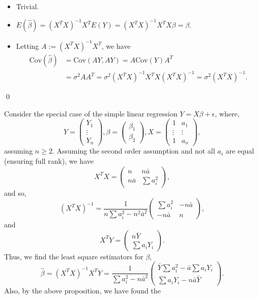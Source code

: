 \documentclass[
]{article}
\theoremstyle{definition}
\theoremstyle{definition}
\begin{document}
\begin{itemize}
    \item Trivial.
    \item \(E(\hat \beta) = (X^TX)^{-1} X^T E(Y) = (X^TX)^{-1} X^T X \beta = \beta\).
    \item Letting \(A := (X^T X)^{-1} X^T\), we have 
      \[\begin{split}
        \text{Cov}(\hat \beta) & = \text{Cov}(A Y, A Y) = A \text{Cov}(Y) A^T\\
          & = \sigma^2A A^T = \sigma^2 (X^T X)^{-1} X^T X (X^T X)^{-1} = \sigma^2 (X^T X)^{-1}.
      \end{split}\]
  \end{itemize}
\qed

Consider the special case of the simple linear regression
\(Y = X \beta + \epsilon\), where, \[
Y = \begin{pmatrix}
      Y_1 \\ \vdots \\ Y_n
    \end{pmatrix},
\beta = \begin{pmatrix}
      \beta_1 \\ \beta_2
    \end{pmatrix},
X = \begin{pmatrix}
      1 & a_1 \\ \vdots & \vdots \\ 1 & a_n
    \end{pmatrix},\] assuming \(n \ge 2\). Assuming the second order
assumption and not all \(a_i\) are equal (ensuring full rank), we have
\[X^T X = \begin{pmatrix}
  n & n \bar a \\ n \bar a & \sum a_i^2
\end{pmatrix},\] and so,
\[(X^T X)^{-1} = \frac{1}{n \sum a_i^2 - n^2 \bar a^2}
\begin{pmatrix}
  \sum a_i^2 & -n \bar a \\ - n \bar a & n
\end{pmatrix},\] and \[X^T Y = \begin{pmatrix}
  n \bar Y \\ \sum a_i Y_i
\end{pmatrix}.\] Thus, we find the least square estimators for
\(\beta\), \[\hat \beta = (X^T X)^{-1}X^T Y = 
\frac{1}{\sum a_i^2 - n \bar a^2}
\begin{pmatrix}
  \bar Y \sum a_i^2 - \bar a \sum a_i Y_i\\
  \sum a_i Y_i - n \bar a \bar Y
\end{pmatrix}.\] Also, by the above proposition, we have found the
\end{document}
